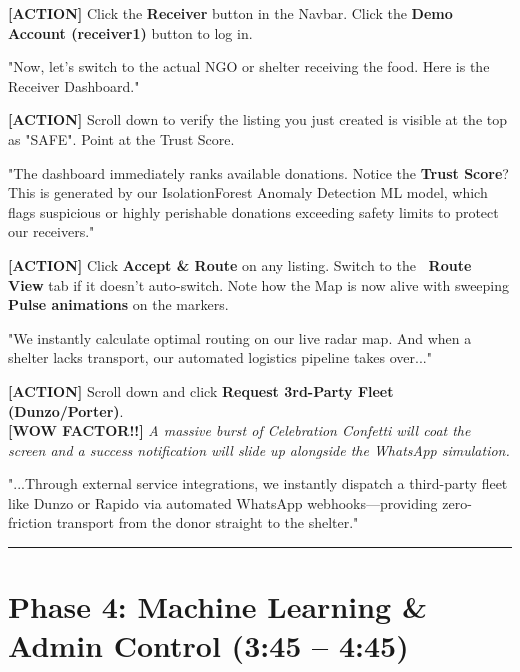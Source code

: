 \documentclass[12pt,a4paper]{article}
\begin{document}
\noindent\textcolor{action}{\textbf{[ACTION]}} Click the \textbf{Receiver} button in the Navbar. Click the \textbf{Demo Account (receiver1)} button to log in.

\begin{scriptbox}
"Now, let’s switch to the actual NGO or shelter receiving the food. Here is the Receiver Dashboard."
\end{scriptbox}

\noindent\textcolor{action}{\textbf{[ACTION]}} Scroll down to verify the listing you just created is visible at the top as "SAFE". Point at the Trust Score.

\begin{scriptbox}
"The dashboard immediately ranks available donations. Notice the \textbf{Trust Score}? This is generated by our IsolationForest Anomaly Detection ML model, which flags suspicious or highly perishable donations exceeding safety limits to protect our receivers."
\end{scriptbox}

\noindent\textcolor{action}{\textbf{[ACTION]}} Click \textbf{Accept \& Route} on any listing. Switch to the \textbf{\faMap\ Route View} tab if it doesn't auto-switch. Note how the Map is now alive with sweeping \textbf{Pulse animations} on the markers.

\begin{scriptbox}
"We instantly calculate optimal routing on our live radar map. And when a shelter lacks transport, our automated logistics pipeline takes over..."
\end{scriptbox}

\noindent\textcolor{action}{\textbf{[ACTION]}} Scroll down and click \textbf{Request 3rd-Party Fleet (Dunzo/Porter)}. \\
\noindent\textcolor{wow}{\textbf{[WOW FACTOR!!]}} \textit{A massive burst of Celebration Confetti will coat the screen and a success notification will slide up alongside the WhatsApp simulation.}

\begin{scriptbox}
"...Through external service integrations, we instantly dispatch a third-party fleet like Dunzo or Rapido via automated WhatsApp webhooks—providing zero-friction transport from the donor straight to the shelter."
\end{scriptbox}

\vspace{1em}
\hrule
\vspace{1em}

\section*{Phase 4: Machine Learning \& Admin Control (3:45 – 4:45)}
\end{document}
